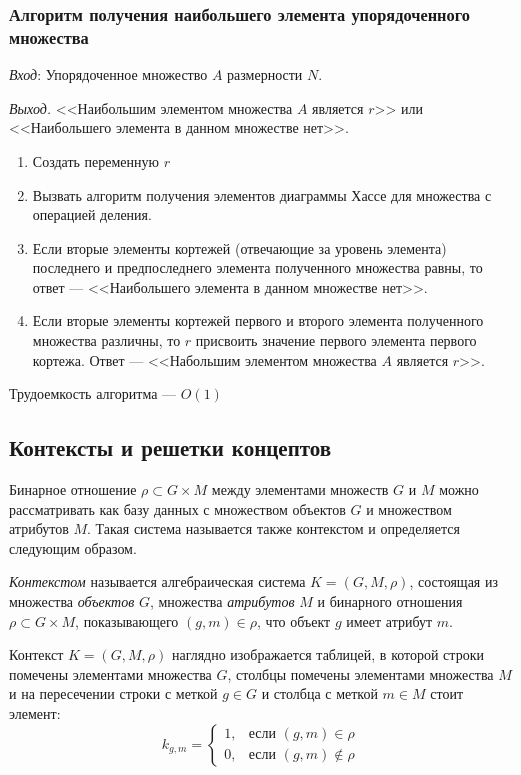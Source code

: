 \documentclass[bachelor, och, labwork]{shiza}
\begin{document}
\subsubsection{Алгоритм получения наибольшего элемента упорядоченного множества}
\textit{Вход}: Упорядоченное множество $A$ размерности $N$.

\textit{Выход.} <<Наибольшим элементом множества $A$ является $r$>> 
или <<Наибольшего элемента в данном множестве нет>>.
\begin{enumerate}
    \item Создать переменную $r$
    \item Вызвать алгоритм получения элементов диаграммы Хассе для множества с операцией деления.
    \item Если вторые элементы кортежей (отвечающие за уровень элемента) последнего
    и предпоследнего элемента полученного множества равны, то ответ --- <<Наибольшего элемента в данном множестве нет>>.
    \item Если вторые элементы кортежей первого и второго элемента полученного 
    множества различны, то $r$ присвоить значение первого элемента первого кортежа.
    Ответ --- <<Набольшим элементом множества $A$ является $r$>>.
\end{enumerate} 
Трудоемкость алгоритма --- $O(1)$

\subsection{Контексты и решетки концептов}
Бинарное отношение $\rho \subset G\times M$ между элементами множеств $G$ и $M$
можно рассматривать как базу данных с множеством объектов $G$ и множеством
атрибутов $M$. Такая система называется также контекстом и определяется следующим
образом.

\textit{Контекстом} называется алгебраическая система $K=(G,M,\rho)$, состоящая
из множества \textit{объектов} $G$, множества \textit{атрибутов} $M$ и бинарного
отношения $\rho \subset G\times M$, показывающего $(g,m)\in\rho$, что объект $g$
имеет атрибут $m$.

Контекст $K = (G,M,\rho)$ наглядно изображается таблицей, в которой строки
помечены элементами множества $G$, столбцы помечены элементами множества $M$ и
на пересечении строки с меткой $g \in G$ и столбца с меткой $m \in M$ стоит 
элемент:
\begin{equation*}
    k_{g,m} = 
        \begin{cases}
            1, &\text{если $(g,m) \in \rho$}\\
            0, &\text{если  $(g,m) \not\in \rho$}
        \end{cases}
\end{equation*}
\end{document}
